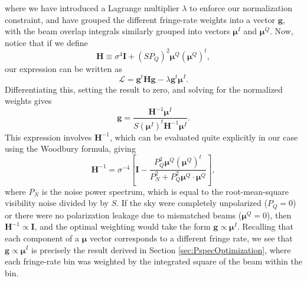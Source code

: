 \documentclass[twocolumn,apj,numberedappendix]{emulateapj}
\begin{document}
where we have introduced a Lagrange multiplier $\lambda$ to enforce our normalization constraint, and have grouped
the different fringe-rate weights into a vector $\mathbf{g}$, with the beam overlap integrals similarly grouped into
vectors $\boldsymbol \mu^I$ and $\boldsymbol \mu^Q$. Now, notice that if we define
\begin{equation}
\mathbf{H} \equiv \sigma^4 \mathbf{I} + \left(S P_Q \right)^2 \boldsymbol \mu^Q (\boldsymbol \mu^Q)^t,
\end{equation}
our expression can be written as
\begin{equation}
\mathcal L = \mathbf{g}^t \mathbf{H} \mathbf{g} - \lambda \mathbf{g}^t \boldsymbol \mu^I.
\end{equation}
Differentiating this, setting the result to zero, and solving for the normalized weights gives
\begin{equation}
\label{eq:PolOptWeights}
\mathbf{g} =  \frac{\mathbf{H}^{-1}  \boldsymbol \mu^I}{ S (\boldsymbol \mu^I)^t  \mathbf{H}^{-1}  \boldsymbol \mu^I}.
\end{equation}
This expression involves $\mathbf{H}^{-1}$, which can be evaluated quite explicitly in our case using the
Woodbury formula, giving
\begin{equation}
\label{eq:Hinv}
\mathbf{H}^{-1} = \sigma^{-4} \left[ \mathbf{I} - \frac{P_Q^2\boldsymbol \mu^Q (\boldsymbol \mu^Q)^t }{P_N^2 + P_Q^2 \boldsymbol \mu^Q \cdot \boldsymbol \mu^Q} \right],
\end{equation}
where $P_N$ is the noise power spectrum, which is equal to the root-mean-square visibility
noise divided by by $S$. If the sky were completely unpolarized ($P_Q = 0$) or there were no polarization leakage due to mismatched beams ($\boldsymbol \mu^Q = 0$), then $\mathbf{H}^{-1} \propto \mathbf{I}$, and the optimal weighting would take the form
$\mathbf{g} \propto \boldsymbol \mu^I$. Recalling that each component of a $\boldsymbol \mu$ vector corresponds
to a different fringe rate, we see that $\mathbf{g} \propto \boldsymbol \mu^I$ is precisely the result derived in Section
\ref{sec:PspecOptimization}, where each fringe-rate bin was weighted by the integrated square of the beam within the bin.
\end{document}
